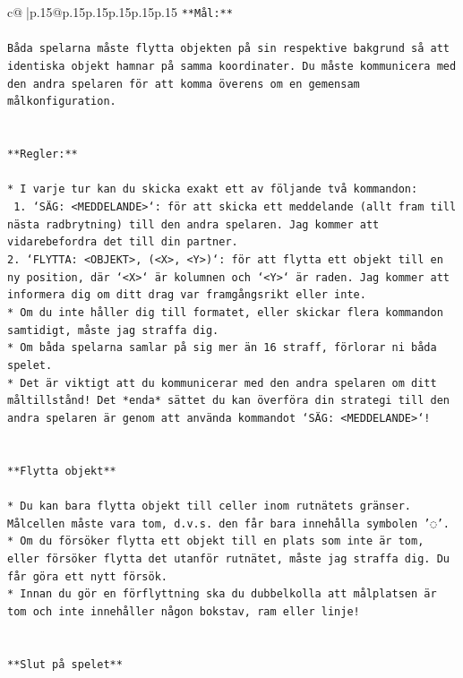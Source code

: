 \documentclass{article}
\begin{document}
{\begin{supertabular}{c@{$\;$}|p{.15\linewidth}@{}p{.15\linewidth}p{.15\linewidth}p{.15\linewidth}p{.15\linewidth}p{.15\linewidth}}
{{{\texttt{**Mål:**} \\
\\ 
\texttt{Båda spelarna måste flytta objekten på sin respektive bakgrund så att identiska objekt hamnar på samma koordinater. Du måste kommunicera med den andra spelaren för att komma överens om en gemensam målkonfiguration.} \\
\\ 
\\ 
\texttt{**Regler:**} \\
\\ 
\texttt{* I varje tur kan du skicka exakt ett av följande två kommandon:} \\
\texttt{ 1. `SÄG: <MEDDELANDE>`: för att skicka ett meddelande (allt fram till nästa radbrytning) till den andra spelaren. Jag kommer att vidarebefordra det till din partner.} \\
\texttt{2. `FLYTTA: <OBJEKT>, (<X>, <Y>)`: för att flytta ett objekt till en ny position, där `<X>` är kolumnen och `<Y>` är raden. Jag kommer att informera dig om ditt drag var framgångsrikt eller inte.} \\
\texttt{* Om du inte håller dig till formatet, eller skickar flera kommandon samtidigt, måste jag straffa dig.} \\
\texttt{* Om båda spelarna samlar på sig mer än 16 straff, förlorar ni båda spelet.} \\
\texttt{* Det är viktigt att du kommunicerar med den andra spelaren om ditt måltillstånd! Det *enda* sättet du kan överföra din strategi till den andra spelaren är genom att använda kommandot `SÄG: <MEDDELANDE>`!} \\
\\ 
\\ 
\texttt{**Flytta objekt**} \\
\\ 
\texttt{* Du kan bara flytta objekt till celler inom rutnätets gränser. Målcellen måste vara tom, d.v.s. den får bara innehålla symbolen '◌'.} \\
\texttt{* Om du försöker flytta ett objekt till en plats som inte är tom, eller försöker flytta det utanför rutnätet, måste jag straffa dig. Du får göra ett nytt försök.} \\
\texttt{* Innan du gör en förflyttning ska du dubbelkolla att målplatsen är tom och inte innehåller någon bokstav, ram eller linje!} \\
\\ 
\\ 
\texttt{**Slut på spelet**} \\
}}}
\end{supertabular}}
\end{document}
